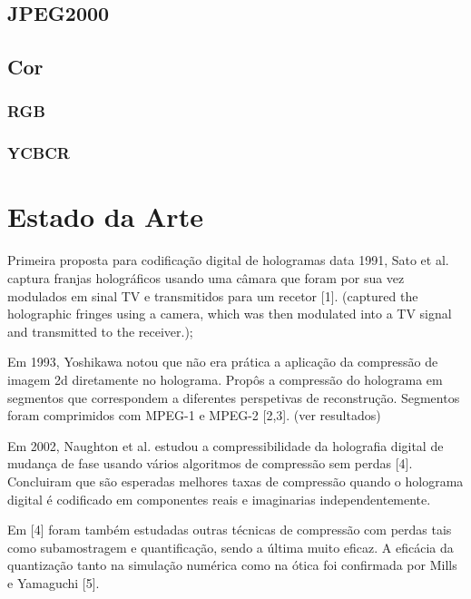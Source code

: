\subsection{JPEG2000}
\label{chap2:subsec:jpeg2000}



\subsection{Cor}
\label{chap2:subsec:cor}

\subsubsection{RGB}
\label{chap2:ssubsec:rgb}

\subsubsection{YCBCR}
\label{chap2:ssubsec:ycbcr}



\section{Estado da Arte}
\label{chap2:sec:estado-arte}


Primeira proposta para codificação digital de hologramas data 1991, Sato et al. captura franjas holográficos usando uma câmara que foram por sua vez modulados em sinal TV e transmitidos para um recetor [1]. (captured the holographic fringes using a camera, which was then modulated into a TV signal and transmitted to the receiver.);
  
Em 1993, Yoshikawa notou que não era prática a aplicação da compressão de imagem 2d diretamente no holograma. Propôs a compressão do holograma em segmentos que correspondem a diferentes perspetivas de reconstrução. Segmentos foram comprimidos com MPEG-1 e MPEG-2 [2,3]. (ver resultados)

Em 2002, Naughton et al. estudou a compressibilidade da holografia digital de mudança de fase usando vários algoritmos de compressão sem perdas [4]. Concluiram que são esperadas melhores taxas de compressão quando o holograma digital é codificado em componentes reais e imaginarias independentemente.

Em [4] foram também estudadas outras técnicas de compressão com perdas tais como subamostragem e quantificação, sendo a última muito eficaz. A eficácia da quantização tanto na simulação numérica como na ótica foi confirmada por Mills e Yamaguchi [5].

